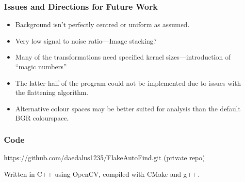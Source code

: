 \documentclass{beamer}
\begin{document}
\begin{frame}
	\frametitle{Issues and Directions for Future Work}
	\begin{itemize}
		\item<1-> Background isn't perfectly centred or uniform as assumed.
		\item<2-> Very low signal to noise ratio---Image stacking?
		\item<3-> Many of the transformations need specified kernel sizes---introduction of ``magic numbers''
		\item<4-> The latter half of the program could not be implemented due to issues with the flattening algorithm.
		\item<5-> Alternative colour spaces may be better suited for analysis than the default BGR colourspace.
	\end{itemize}
	
\end{frame}

\begin{frame}
	\frametitle{Code}
	https://github.com/daedalus1235/FlakeAutoFind.git (private repo)

	Written in C++ using OpenCV, compiled with CMake and g++.
\end{frame}
\end{document}
